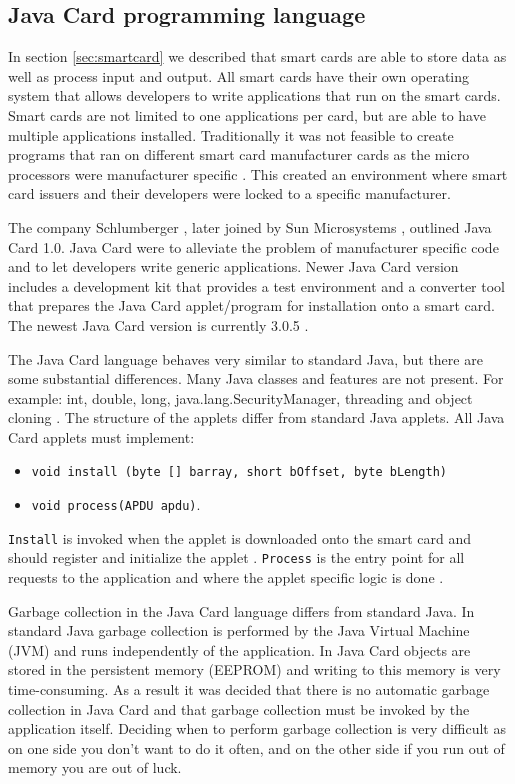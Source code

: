 \subsection{Java Card programming language}
\label{sec:javacard}
In section \ref{sec:smartcard} we described that smart cards are able to store data as well as process input and output. All smart cards have their own operating system that allows developers to write applications that run on the smart cards. Smart cards are not limited to one applications per card, but are able to have multiple applications installed. Traditionally it was not feasible to create programs that ran on different smart card manufacturer cards as the micro processors were manufacturer specific \cite{javacardapplet}. This created an environment where smart card issuers and their developers were locked to a specific manufacturer.

The company Schlumberger \cite{schlumberger}, later joined by Sun Microsystems \cite{sunMicroSystems}, outlined Java Card 1.0. Java Card were to alleviate the problem of manufacturer specific code and to let developers write generic applications. Newer Java Card version includes a development kit that provides a test environment and a converter tool that prepares the Java Card applet/program for installation onto a smart card. The newest Java Card version is currently 3.0.5 \cite{javacard305}.

The Java Card language behaves very similar to standard Java, but there are some substantial differences. Many Java classes and features are not present. For example: int, double, long, java.lang.SecurityManager, threading and object cloning \cite{javacardlimits}. The structure of the applets differ from standard Java applets. All Java Card applets must implement:
\begin{itemize}
    \item \texttt{void install (byte [] barray, short bOffset, byte bLength)}
    \item \texttt{void process(APDU apdu)}.
\end{itemize}
\texttt{Install} is invoked when the applet is downloaded onto the smart card and should register and initialize the applet \cite{javacardinstall}. \texttt{Process} is the entry point for all requests to the application and where the applet specific logic is done \cite{javacardprocess}.

Garbage collection in the Java Card language differs from standard Java. In standard Java garbage collection is performed by the Java Virtual Machine (JVM) and runs independently of the application. In Java Card objects are stored in the persistent memory (EEPROM) and writing to this memory is very time-consuming. As a result it was decided that there is no automatic garbage collection in Java Card and that garbage collection must be invoked by the application itself. Deciding when to perform garbage collection is very difficult as on one side you don't want to do it often, and on the other side if you run out of memory you are out of luck.

